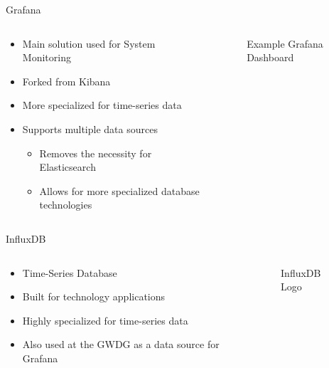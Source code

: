 \documentclass[compress,aspectratio=169]{beamer}
\begin{document}
\begin{frame}{Grafana}
\begin{columns}[T]
\begin{column}{0.5\textwidth}
\begin{itemize}
  \item Main solution used for System Monitoring
  \item Forked from Kibana
  \item More specialized for time-series data
  \item Supports multiple data sources
  \begin{itemize}
    \item Removes the necessity for Elasticsearch
    \item Allows for more specialized database technologies
  \end{itemize}
\end{itemize}
\end{column}
\begin{column}{0.5\textwidth}
\begin{figure}
  \caption{Example Grafana Dashboard}
\end{figure}
\end{column}
\end{columns}
\end{frame}

\begin{frame}{InfluxDB}
\begin{columns}[T]
\begin{column}{0.5\textwidth}
\begin{itemize}
  \item Time-Series Database
  \item Built for technology applications
  \item Highly specialized for time-series data
  \item Also used at the GWDG as a data source for Grafana
\end{itemize}
\end{column}
\begin{column}{0.5\textwidth}
\begin{figure}
  \caption{InfluxDB Logo}
\end{figure}
\end{column}
\end{columns}
\end{frame}
\end{document}
